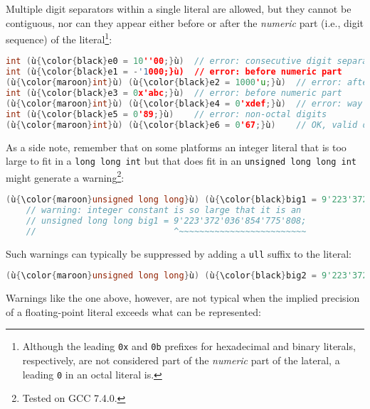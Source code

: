 \noindent Multiple digit separators within a single literal are allowed, but they
cannot be contiguous, nor can they appear either before or after the
\emph{numeric} part (i.e., digit sequence) of the
literal{\cprotect\footnote{Although the leading \texttt{0x} and
\texttt{0b} prefixes for hexadecimal and binary literals,
respectively, are not considered part of the \emph{numeric} part of
  the lateral, a leading \texttt{0} in an octal literal is.}}:

\begin{lstlisting}[language=C++]
int (ù{\color{black}e0 = 10''00;}ù)  // error: consecutive digit separators
int (ù{\color{black}e1 = -'1000;}ù)  // error: before numeric part
(ù{\color{maroon}int}ù) (ù{\color{black}e2 = 1000'u;}ù)  // error: after numeric part
int (ù{\color{black}e3 = 0x'abc;}ù)  // error: before numeric part
(ù{\color{maroon}int}ù) (ù{\color{black}e4 = 0'xdef;}ù)  // error: way before numeric part
int (ù{\color{black}e5 = 0'89;}ù)    // error: non-octal digits
(ù{\color{maroon}int}ù) (ù{\color{black}e6 = 0'67;}ù)    // OK, valid octal literal
\end{lstlisting}
    
\noindent As a side note, remember that on some platforms an integer literal
that is too large to fit in a \texttt{long}~\texttt{long}~\texttt{int} but that does fit in an
\texttt{unsigned}~\texttt{long}~\texttt{long}~\texttt{int} might
generate a warning{\cprotect\footnote{Tested on GCC 7.4.0.}}:

\begin{lstlisting}[language=C++]
(ù{\color{maroon}unsigned long long}ù) (ù{\color{black}big1 = 9'223'372'036'854'775'808;}ù)  // (ù{\codeincomments{2\^{}63}}ù)
    // warning: integer constant is so large that it is an
    // unsigned long long big1 = 9'223'372'036'854'775'808;
    //                           ^~~~~~~~~~~~~~~~~~~~~~~~~~
\end{lstlisting}
    
\noindent Such warnings can typically be suppressed by adding a \texttt{ull}
suffix to the literal:

\begin{lstlisting}[language=C++]
(ù{\color{maroon}unsigned long long}ù) (ù{\color{black}big2 = 9'223'372'036'854'775'808ull;}ù)  // OK
\end{lstlisting}
    
\noindent Warnings like the one above, however, are not typical when the implied
precision of a floating-point literal exceeds what can be represented:

